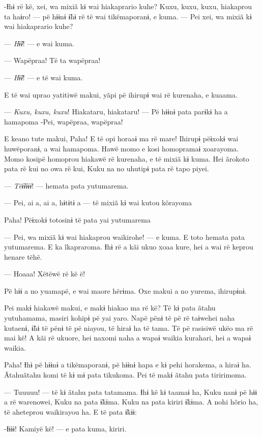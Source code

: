 -Ɨhɨ rë kë, xei, wa mixiã kɨ wai hiakaprario kuhe? Kuxu, kuxu, kuxu,
hiakaprou ta haɨro! --- pë hɨɨnɨ ɨ̃hɨ rë të wai tikëmaporanɨ, e kuma. ---
Pei xei, wa mixiã kɨ wai hiakaprario kuhe?

--- \textit{Hɨ̃ɨ}! --- e wai kuma. 

--- Wapëpraa! Të ta wapëpraa! 

--- \textit{Hɨ̃ɨ}! --- e të wai kuma. 

E të wai uprao yatitiwë makui, yãpi pë ihirupɨ wai rë kurenaha, e
kuaama. 

--- \textit{Kuxu, kuxu, kuxu}! Hiakataru, hiakataru! --- Pë hɨɨnɨ pata parɨkɨ ha a
hamapoma -Pei, wapëpraa, wapëpraa! 

E keano tute makui, Paha! E të opi horaaɨ ma rë mare! Ihirupɨ pëɨxokɨ
wai huwëporanɨ, a wai hamapoma. Hawë momo e kosi homopramaɨ xoarayoma.
Momo kosipë homoprou hiakawë rë kurenaha, e të mixiã kɨ kuma. Hei
ãrokoto pata rë kui no owa rë kui, Kuku na no uhutipɨ pata rë tapo
piyei. 

--- \textit{Tëɨ̃ɨɨɨɨ}! --- hemata pata yutumarema. 

--- Pei, ai a, ai a, hɨtɨtɨ a --- të mixiã kɨ wai kutou kõrayoma 

Paha! Pëɨxokɨ totosinɨ të pata yai yutumarema 

--- Pei, wa mixiã kɨ wai hiakaprou waikirohe! --- e kuma. E toto hemata
pata yutumarema. E ka ĩkapraroma. Ɨhɨ rë a kãi ukuo xoaa kure, hei a wai
rë keprou henare tëhë. 

--- Hoaaa! Xëtëwë rë kë ë! 

Pë hɨɨ a no yuamapë, e wai maore hërɨma. Oxe makui a no yurema,
ihirupɨnɨ. 

Pei makɨ hiakawë makui, e makɨ hiakao ma rë kë? Të kɨ pata ãtahu
yutuhamama, masiri kohipɨ pë yai yaro. Napë pënɨ të pë rë taɨwehei naha
kutaenɨ, ɨ̃hɨ të pënɨ të pë niayou, të hiraɨ ha të tama. Të pë rasisiwë
ukëo ma rë mai kë! A kãi rë ukuore, hei naxomi naha a wapaɨ waikia
kurahari, hei a wapaɨ waikia. 

Paha! Ɨhɨ pë hɨɨnɨ a tikëmaporanɨ, pë hɨɨnɨ hapa e kɨ pehi horakema, a
hiraɨ ha. Ãtahuãtahu komi të kɨ mɨ pata tikukoma. Pei të makɨ ãtahu pata
tiririmoma. 

--- Tuuuuu! --- të kɨ ãtahu pata tatamama. Ɨhɨ kë kɨ taamaɨ ha, Kuku nanɨ
pë hɨɨ a rë warenowei, Kuku na pata ɨ̃kɨma. Kuku na pata kiriri ɨ̃kɨma. A nohi hõrio ha, të aheteprou waikirayou ha. E të pata ɨ̃kɨɨ:

-Ɨɨɨɨ! Kamiyë kë! --- e pata kuma, kiriri. 

